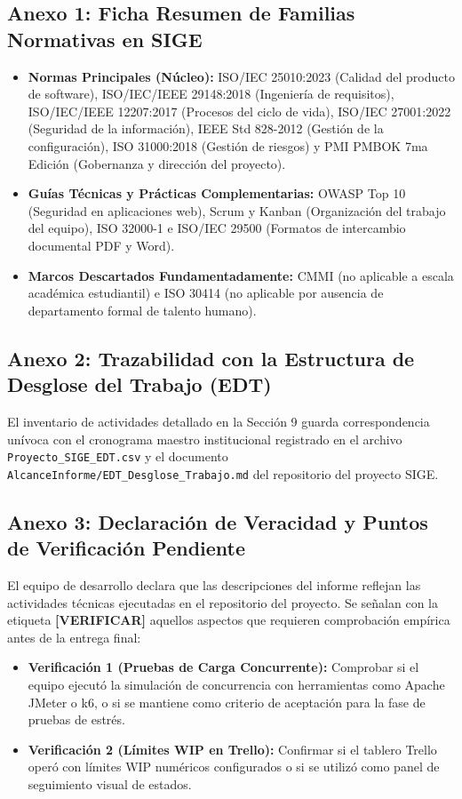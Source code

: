 \documentclass[12pt,a4paper]{article}
\begin{document}
\subsection*{Anexo 1: Ficha Resumen de Familias Normativas en SIGE}
\begin{itemize}[leftmargin=1.5em, itemsep=2pt]
    \item \textbf{Normas Principales (Núcleo):} ISO/IEC 25010:2023 (Calidad del producto de software), ISO/IEC/IEEE 29148:2018 (Ingeniería de requisitos), ISO/IEC/IEEE 12207:2017 (Procesos del ciclo de vida), ISO/IEC 27001:2022 (Seguridad de la información), IEEE Std 828-2012 (Gestión de la configuración), ISO 31000:2018 (Gestión de riesgos) y PMI PMBOK 7ma Edición (Gobernanza y dirección del proyecto).
    \item \textbf{Guías Técnicas y Prácticas Complementarias:} OWASP Top 10 (Seguridad en aplicaciones web), Scrum y Kanban (Organización del trabajo del equipo), ISO 32000-1 e ISO/IEC 29500 (Formatos de intercambio documental PDF y Word).
    \item \textbf{Marcos Descartados Fundamentadamente:} CMMI (no aplicable a escala académica estudiantil) e ISO 30414 (no aplicable por ausencia de departamento formal de talento humano).
\end{itemize}

\subsection*{Anexo 2: Trazabilidad con la Estructura de Desglose del Trabajo (EDT)}
El inventario de actividades detallado en la Sección 9 guarda correspondencia unívoca con el cronograma maestro institucional registrado en el archivo \texttt{Proyecto\_SIGE\_EDT.csv} y el documento \texttt{AlcanceInforme/EDT\_Desglose\_Trabajo.md} del repositorio del proyecto SIGE.

\subsection*{Anexo 3: Declaración de Veracidad y Puntos de Verificación Pendiente}
El equipo de desarrollo declara que las descripciones del informe reflejan las actividades técnicas ejecutadas en el repositorio del proyecto. Se señalan con la etiqueta \textbf{[VERIFICAR]} aquellos aspectos que requieren comprobación empírica antes de la entrega final:
\begin{itemize}[leftmargin=1.5em, itemsep=2pt]
    \item \textbf{Verificación 1 (Pruebas de Carga Concurrente):} Comprobar si el equipo ejecutó la simulación de concurrencia con herramientas como Apache JMeter o k6, o si se mantiene como criterio de aceptación para la fase de pruebas de estrés.
    \item \textbf{Verificación 2 (Límites WIP en Trello):} Confirmar si el tablero Trello operó con límites WIP numéricos configurados o si se utilizó como panel de seguimiento visual de estados.
\end{itemize}
\end{document}
